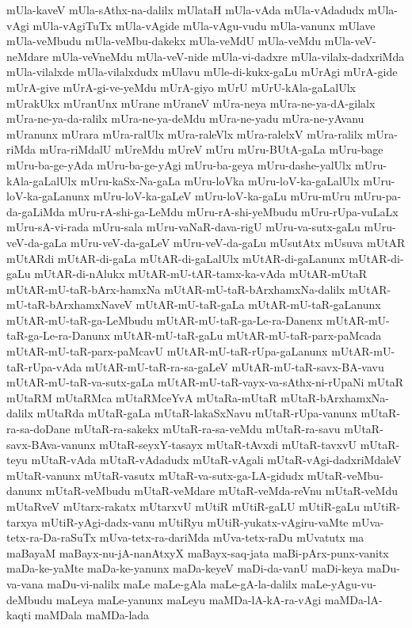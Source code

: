 {mUla-kaveV
mUla-sAthx-na-dalilx
mUlataH
mUla-vAda
mUla-vAdadudx
mUla-vAgi
mUla-vAgiTuTx
mUla-vAgide
mUla-vAgu-vudu
mUla-vanunx
mUlave
mUla-veMbudu
mUla-veMbu-dakekx
mUla-veMdU
mUla-veMdu
mUla-veV-neMdare
mUla-veVneMdu
mUla-veV-nide
mUla-vi-dadxre
mUla-vilalx-dadxriMda
mUla-vilalxde
mUla-vilalxdudx
mUlavu
mUle-di-kukx-gaLu
mUrAgi
mUrA-gide
mUrA-give
mUrA-gi-ve-yeMdu
mUrA-giyo
mUrU
mUrU-kAla-gaLalUlx
mUrakUkx
mUranUnx
mUrane
mUraneV
mUra-neya
mUra-ne-ya-dA-gilalx
mUra-ne-ya-da-ralilx
mUra-ne-ya-deMdu
mUra-ne-yadu
mUra-ne-yAvanu
mUranunx
mUrara
mUra-ralUlx
mUra-raleVlx
mUra-ralelxV
mUra-ralilx
mUra-riMda
mUra-riMdalU
mUreMdu
mUreV
mUru
mUru-BUtA-gaLa
mUru-bage
mUru-ba-ge-yAda
mUru-ba-ge-yAgi
mUru-ba-geya
mUru-dashe-yalUlx
mUru-kAla-gaLalUlx
mUru-kaSx-Na-gaLa
mUru-loVka
mUru-loV-ka-gaLalUlx
mUru-loV-ka-gaLanunx
mUru-loV-ka-gaLeV
mUru-loV-ka-gaLu
mUru-mUru
mUru-pa-da-gaLiMda
mUru-rA-shi-ga-LeMdu
mUru-rA-shi-yeMbudu
mUru-rUpa-vuLaLx
mUru-sA-vi-rada
mUru-sala
mUru-vaNaR-dava-rigU
mUru-va-sutx-gaLu
mUru-veV-da-gaLa
mUru-veV-da-gaLeV
mUru-veV-da-gaLu
mUsutAtx
mUsuva
mUtAR
mUtARdi
mUtAR-di-gaLa
mUtAR-di-gaLalUlx
mUtAR-di-gaLanunx
mUtAR-di-gaLu
mUtAR-di-nAlukx
mUtAR-mU-tAR-tamx-ka-vAda
mUtAR-mUtaR
mUtAR-mU-taR-bArx-hamxNa
mUtAR-mU-taR-bArxhamxNa-dalilx
mUtAR-mU-taR-bArxhamxNaveV
mUtAR-mU-taR-gaLa
mUtAR-mU-taR-gaLanunx
mUtAR-mU-taR-ga-LeMbudu
mUtAR-mU-taR-ga-Le-ra-Danenx
mUtAR-mU-taR-ga-Le-ra-Danunx
mUtAR-mU-taR-gaLu
mUtAR-mU-taR-parx-paMcada
mUtAR-mU-taR-parx-paMcavU
mUtAR-mU-taR-rUpa-gaLanunx
mUtAR-mU-taR-rUpa-vAda
mUtAR-mU-taR-ra-sa-gaLeV
mUtAR-mU-taR-savx-BA-vavu
mUtAR-mU-taR-va-sutx-gaLa
mUtAR-mU-taR-vayx-va-sAthx-ni-rUpaNi
mUtaR
mUtaRM
mUtaRMca
mUtaRMceYvA
mUtaRa-mUtaR
mUtaR-bArxhamxNa-dalilx
mUtaRda
mUtaR-gaLa
mUtaR-lakaSxNavu
mUtaR-rUpa-vanunx
mUtaR-ra-sa-doDane
mUtaR-ra-sakekx
mUtaR-ra-sa-veMdu
mUtaR-ra-savu
mUtaR-savx-BAva-vanunx
mUtaR-seyxY-tasayx
mUtaR-tAvxdi
mUtaR-tavxvU
mUtaR-teyu
mUtaR-vAda
mUtaR-vAdadudx
mUtaR-vAgali
mUtaR-vAgi-dadxriMdaleV
mUtaR-vanunx
mUtaR-vasutx
mUtaR-va-sutx-ga-LA-gidudx
mUtaR-veMbu-danunx
mUtaR-veMbudu
mUtaR-veMdare
mUtaR-veMda-reVnu
mUtaR-veMdu
mUtaRveV
mUtarx-rakatx
mUtarxvU
mUtiR
mUtiR-gaLU
mUtiR-gaLu
mUtiR-tarxya
mUtiR-yAgi-dadx-vanu
mUtiRyu
mUtiR-yukatx-vAgiru-vaMte
mUva-tetx-ra-Da-raSuTx
mUva-tetx-ra-dariMda
mUva-tetx-raDu
mUvatutx
ma
maBayaM
maBayx-nu-jA-nanAtxyX
maBayx-saq-jata
maBi-pArx-punx-vanitx
maDa-ke-yaMte
maDa-ke-yanunx
maDa-keyeV
maDi-da-vanU
maDi-keya
maDu-va-vana
maDu-vi-nalilx
maLe
maLe-gAla
maLe-gA-la-dalilx
maLe-yAgu-vu-deMbudu
maLeya
maLe-yanunx
maLeyu
maMDa-lA-kA-ra-vAgi
maMDa-lA-kaqti
maMDala
maMDa-lada
}
